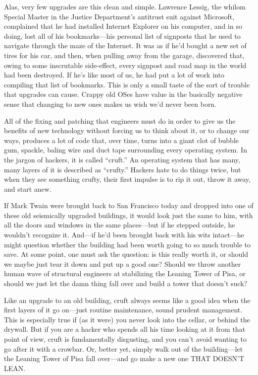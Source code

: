 \documentclass[
  fontsize=11pt,
  paper=landscape,
  twocolumn=true,
  pagesize=pdftex,
  headings=small,
  DIV=15,
  ]{scrartcl}
\begin{document}
Alas, very few upgrades are this clean and simple. Lawrence Lessig, the
whilom Special Master in the Justice Department's antitrust suit against
Microsoft, complained that he had installed Internet Explorer on his
computer, and in so doing, lost all of his bookmarks---his personal list
of signposts that he used to navigate through the maze of the Internet.
It was as if he'd bought a new set of tires for his car, and then, when
pulling away from the garage, discovered that, owing to some inscrutable
side-effect, every signpost and road map in the world had been
destroyed. If he's like most of us, he had put a lot of work into
compiling that list of bookmarks. This is only a small taste of the sort
of trouble that upgrades can cause. Crappy old OSes have value in the
basically negative sense that changing to new ones makes us wish we'd
never been born.

All of the fixing and patching that engineers must do in order to give
us the benefits of new technology without forcing us to think about it,
or to change our ways, produces a lot of code that, over time, turns
into a giant clot of bubble gum, spackle, baling wire and duct tape
surrounding every operating system. In the jargon of hackers, it is
called ``cruft.'' An operating system that has many, many layers of it
is described as ``crufty.'' Hackers hate to do things twice, but when
they see something crufty, their first impulse is to rip it out, throw
it away, and start anew.

If Mark Twain were brought back to San Francisco today and dropped into
one of these old seismically upgraded buildings, it would look just the
same to him, with all the doors and windows in the same places---but if
he stepped outside, he wouldn't recognize it. And---if he'd been brought
back with his wits intact---he might question whether the building had
been worth going to so much trouble to save. At some point, one must ask
the question: is this really worth it, or should we maybe just tear it
down and put up a good one? Should we throw another human wave of
structural engineers at stabilizing the Leaning Tower of Pisa, or should
we just let the damn thing fall over and build a tower that doesn't
suck?

Like an upgrade to an old building, cruft always seems like a good idea
when the first layers of it go on---just routine maintenance, sound
prudent management. This is especially true if (as it were) you never
look into the cellar, or behind the drywall. But if you are a hacker who
spends all his time looking at it from that point of view, cruft is
fundamentally disgusting, and you can't avoid wanting to go after it
with a crowbar. Or, better yet, simply walk out of the building---let
the Leaning Tower of Pisa fall over---and go make a new one THAT DOESN'T
LEAN.
\end{document}
